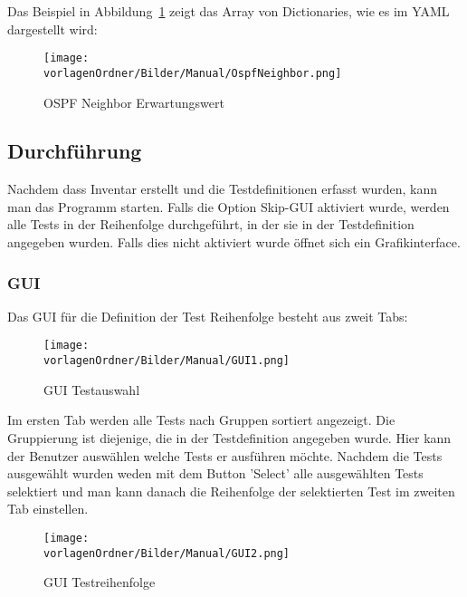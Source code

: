 \documentclass[]{subfiles}
\begin{document}
			
			Das Beispiel in Abbildung~\ref{fig:OSPFNeighborErwartungswert} zeigt das Array von Dictionaries, wie es im YAML dargestellt wird:

			\begin{figure}[h!]
				\begin{center}
					\texttt{[image: \\vorlagenOrdner/Bilder/Manual/OspfNeighbor.png]}
					\caption{OSPF Neighbor Erwartungswert}
					\label{fig:OSPFNeighborErwartungswert}
				\end{center}
			\end{figure}

\subsection{Durchführung}
	Nachdem dass Inventar erstellt und die Testdefinitionen erfasst wurden,
	kann man das Programm starten.
	Falls die Option Skip-GUI aktiviert wurde, werden alle Tests in der Reihenfolge durchgeführt,
	in der sie in der Testdefinition angegeben wurden. 
	Falls dies nicht aktiviert wurde öffnet sich ein Grafikinterface.

	\newpage

	\subsubsection{GUI}
		Das GUI für die Definition der Test Reihenfolge besteht aus zweit Tabs:

		\begin{figure}[h!]
			\begin{center}
				\texttt{[image: \\vorlagenOrdner/Bilder/Manual/GUI1.png]}
				\caption{GUI Testauswahl}
			\end{center}
		\end{figure}

		Im ersten Tab werden alle Tests nach Gruppen sortiert angezeigt.
		Die Gruppierung ist diejenige, die in der Testdefinition angegeben wurde. 
		Hier kann der Benutzer auswählen welche Tests er ausführen möchte.
		Nachdem die Tests ausgewählt wurden weden mit dem Button 'Select' 
		alle ausgewählten Tests selektiert und man kann danach die Reihenfolge der
		selektierten Test im zweiten Tab einstellen.

		\newpage

		\begin{figure}[h!]
			\begin{center}
				\texttt{[image: \\vorlagenOrdner/Bilder/Manual/GUI2.png]}
				\caption{GUI Testreihenfolge}
			\end{center}
		\end{figure}
\end{document}
